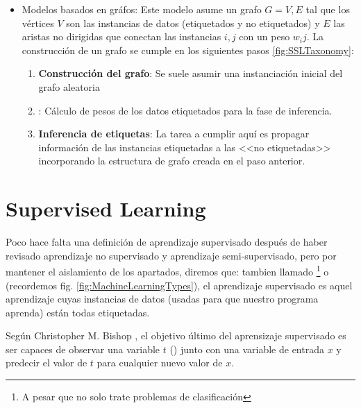 \begin{itemize}
  \item Modelos basados en gráfos: Este modelo asume un grafo $G = {V,E}$ tal que los vértices $V$ son las instancias de datos (etiquetados y no etiquetados) y $E$ las aristas no dirigidas que conectan las instancias $i,j$ con un peso $w_ij$. La construcción de un grafo se cumple en los siguientes pasos  \ref{fig:SSLTaxonomy}:
        \begin{enumerate}
          \item \textbf{Construcción del grafo}: Se suele asumir una instanciación inicial del grafo aleatoria
          \item \textbf{}: Cálculo de pesos de los datos etiquetados para la fase de inferencia.
          \item \textbf{Inferencia de etiquetas}: La tarea a cumplir aquí es propagar información de las instancias etiquetadas a las <<no etiquetadas>> incorporando la estructura de grafo creada en el paso anterior.
        \end{enumerate}
\end{itemize}


\section{Supervised Learning}

Poco hace falta una definición de aprendizaje supervisado después de haber revisado aprendizaje no supervisado y aprendizaje semi-supervisado, pero por mantener el aislamiento de los apartados, diremos que: tambien llamado \footnote{A pesar que no solo trate problemas de clasificación} o  (recordemos fig. \ref{fig:MachineLearningTypes}), el aprendizaje supervisado es aquel aprendizaje cuyas instancias de datos (usadas para que nuestro programa aprenda) están todas etiquetadas.

Según Christopher M. Bishop \et {}, el objetivo último del aprensizaje supervisado es ser capaces de observar una variable $t$ () junto con una variable de entrada $x$ y predecir el valor de $t$ para cualquier nuevo valor de $x$.

